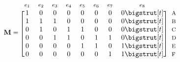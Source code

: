 \begin{exmp}
	 \begin{equation*}
	  \mathbf{M}=
	  \begin{blockarray}{*{8}{c} l}
	    \begin{block}{*{8}{>{$\footnotesize}c<{$}} l}
	      $e_1$ & $e_2$ & $e_3$ & $e_4$ & $e_5$ & $e_6$ & $e_7$ & $e_8$ \\
	    \end{block}
	    \begin{block}{[*{8}{c}]>{$\footnotesize}l<{$}}
	      1 & 0 & 0 & 0 & 0 & 0 & 0 & 0 \bigstrut[t]& A \\
	      1 & 1 & 1 & 0 & 0 & 0 & 0 & 0 \bigstrut[t]&B \\
	      0 & 1 & 0 & 1 & 1 & 0 & 0 & 0 \bigstrut[t]&C \\
	     0 & 0 & 1 & 1 & 0 & 1 & 1 & 0 \bigstrut[t]& D \\
	      0 & 0 & 0 & 0 & 1 & 1 & 0 & 1 \bigstrut[t]& E \\
	     0 & 0 & 0 & 0 & 0 & 0 & 1 & 1 \bigstrut[t]& F \\
	    \end{block}
	  \end{blockarray}
	\end{equation*}
\end{exmp} 
